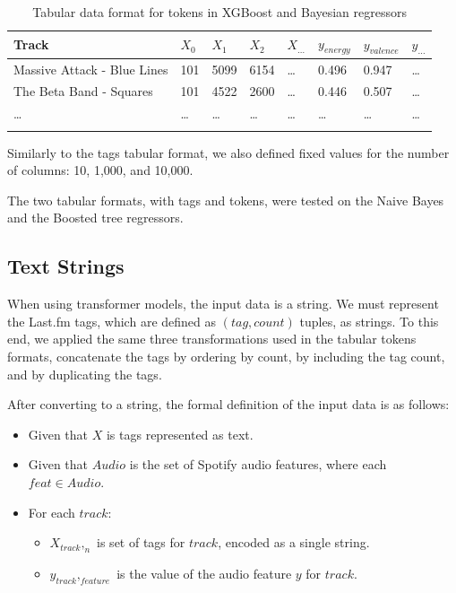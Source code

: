 \documentclass[sn-mathphys]{sn-jnl}%
\theoremstyle{thmstyleone}%
\theoremstyle{thmstyletwo}%
\theoremstyle{thmstylethree}%
\begin{document}
\begin{table}[h]
      \begin{center}
      \begin{minipage}{\textwidth}
      \caption{Tabular data format for tokens in XGBoost and Bayesian regressors}\label{tabular_token_format}%
      \begin{tabular}{@{}llllllll@{}}
      \toprule
      Track                         & $X_{0}$ & $X_{1}$ & $X_{2}$ & $X_{\dots}$ & $y_{energy}$ & $y_{valence}$ & $y_{\dots}$ \\
      \midrule
      Massive Attack - Blue Lines   & 101     & 5099    & 6154    &  \dots      & 0.496        & 0.947         &  \dots  \\
      The Beta Band - Squares       & 101     & 4522    & 2600    &  \dots      & 0.446        & 0.507         &  \dots  \\
      \dots                         & \dots   & \dots   & \dots   &  \dots      & \dots        & \dots         &  \dots  \\
      \botrule
      \end{tabular}
      \end{minipage}
      \end{center}
\end{table}

Similarly to the tags tabular format, we also defined fixed values for the number of columns: 10, 1,000, and 10,000.

The two tabular formats, with tags and tokens, were tested on the Naive Bayes and the Boosted tree regressors.


\subsection{Text Strings}

When using transformer models, the input data is a string.
We must represent the Last.fm tags, which are defined as $(tag, count)$ tuples, as strings.
To this end, we applied the same three transformations used in the tabular tokens formats,
concatenate the tags by ordering by count, by including the tag count, and by duplicating the tags.

After converting to a string, the formal definition of the input data is as follows:

\begin{itemize}
      \item Given that $X$ is tags represented as text.
      \item Given that $Audio$ is the set of Spotify audio features, where each $feat \in Audio$.
      \item For each $track$:
      \begin{itemize}
            \item $X_{track},_{n}$ is set of tags for $track$, encoded as a single string.
            \item $y_{track},_{feature}$ is the value of the audio feature $y$ for $track$.
      \end{itemize}
\end{itemize}
\end{document}
